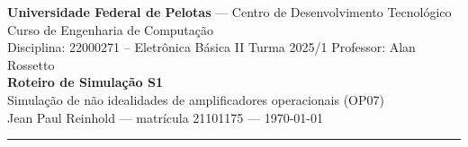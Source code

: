 \documentclass[11pt,a4paper]{article}
\begin{document}
\begin{center}
  {\large \textbf{Universidade Federal de Pelotas} --- Centro de
  Desenvolvimento Tecnológico}\\
  Curso de Engenharia de Computação\\
  Disciplina: 22000271 -- Eletrônica Básica II \quad Turma 2025/1 \quad
  Professor: Alan Rossetto\\[3ex]
  {\LARGE\bfseries Roteiro de Simulação S1}\\[0.6ex]
  {\large Simulação de não idealidades de amplificadores operacionais
  (OP07)}\\[2ex]
  Jean Paul Reinhold --- matrícula 21101175 --- \today
\end{center}

\vspace{1ex}
\hrule
\vspace{2ex}







\end{document}
